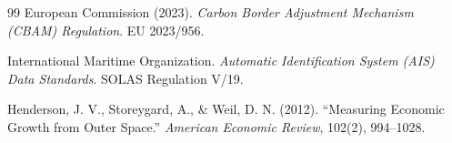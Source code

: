 \documentclass[12pt,a4paper]{article}
\theoremstyle{remark}
\begin{document}
\begin{thebibliography}{99}
 European Commission (2023). \textit{Carbon Border Adjustment Mechanism (CBAM) Regulation}. EU 2023/956.

 International Maritime Organization. \textit{Automatic Identification System (AIS) Data Standards}. SOLAS Regulation V/19.

 Henderson, J. V., Storeygard, A., \& Weil, D. N. (2012). ``Measuring Economic Growth from Outer Space.'' \textit{American Economic Review}, 102(2), 994–1028.

\end{thebibliography}
\end{document}
